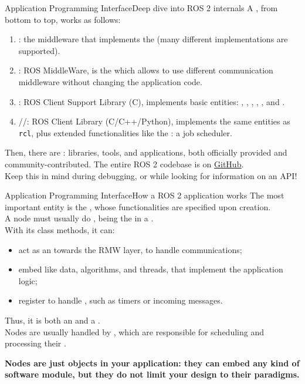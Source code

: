 \begin{frame}{Application Programming Interface}{Deep dive into ROS 2 internals}
  \justifying
	A , from bottom to top, works as follows:
	\begin{enumerate}
		\item {}: the middleware that implements the  (many different implementations are supported).
		\item {}: ROS MiddleWare, is the  which allows to use different communication middleware without changing the application code.
		\item {}: ROS Client Support Library (C), implements basic entities: , , , , , and .
		\item {}//: ROS Client Library (C/C++/Python), implements the same entities as \texttt{rcl}, plus extended functionalities like the : a job scheduler.
	\end{enumerate}
	Then, there are : libraries, tools, and applications, both officially provided and community-contributed. The entire ROS 2 codebase is on \href{https://github.com/ros2}{\color{blue}\underline{GitHub}}.\\
	Keep this in mind during debugging, or while looking for information on an API!
\end{frame}
\begin{frame}{Application Programming Interface}{How a ROS 2 application works}
  \justifying
	The most important entity is the , whose functionalities are specified upon creation.\\
	A node must usually do , being the  in a .\\
	With its class methods, it can:
	\begin{itemize}
		\item act as an  towards the RMW layer, to handle communications;
		\item embed  like data, algorithms, and threads, that implement the application logic;
		\item register  to handle , such as timers or incoming messages.
	\end{itemize}
	Thus, it is both an  and a .\\
	Nodes are usually handled by , which are responsible for scheduling and processing their .
	\begin{block}{}
		\centering
		\textbf{Nodes are just objects in your application: they can embed any kind of software module, but they do not limit your design to their paradigms.}
	\end{block}
\end{frame}

